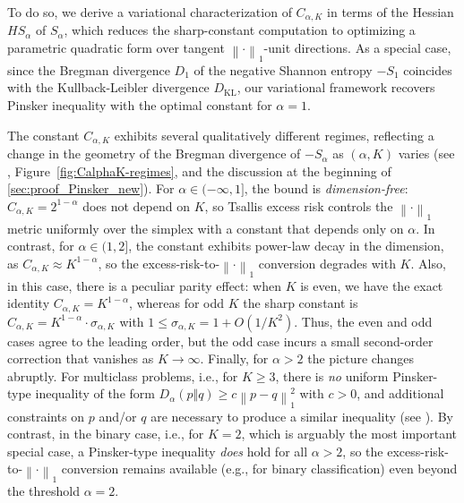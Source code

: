 \documentclass[11pt,oneside,a4paper]{article}
\newcommand{\lno}[1]{\left\lVert#1\right\rVert}
\theoremstyle{plain}
\theoremstyle{definition}
\theoremstyle{remark}
\newcommand{\KL}{D_{\mathrm{KL}}}
\begin{document}
To do so, we derive a variational characterization of $C_{\alpha,K}$ in terms of the Hessian $H S_\alpha$ of $S_\alpha$, which reduces the sharp-constant computation to optimizing a parametric quadratic form over tangent $\lno{\cdot}_1$-unit directions.
As a special case, since the Bregman divergence $D_1$ of the negative Shannon entropy $-S_1$ coincides with the Kullback-Leibler divergence $\KL$, our variational framework recovers Pinsker inequality with the optimal constant for $\alpha = 1$.

The constant $C_{\alpha,K}$ exhibits several qualitatively different regimes, reflecting a
change in the geometry of the Bregman divergence of $-S_\alpha$ as $(\alpha,K)$ varies (see , Figure~\ref{fig:CalphaK-regimes}, and the discussion at the beginning of \cref{sec:proof_Pinsker_new}).
For $\alpha \in (-\infty,1]$, the bound is \emph{dimension-free}: $C_{\alpha,K}=2^{1-\alpha}$ does not depend on $K$,
so Tsallis excess risk controls the $\lno{\cdot}_1$ metric uniformly over the simplex with a constant that depends only on $\alpha$.
In contrast, for $\alpha\in(1,2]$, the constant exhibits power-law decay in the dimension, as 
$C_{\alpha,K} \approx K^{1-\alpha}$, so the excess-risk-to-$\lno{\cdot}_1$ conversion degrades with $K$.
Also, in this case, there is a peculiar parity effect: when $K$ is even, we have the exact identity
$C_{\alpha,K}=K^{1-\alpha}$, whereas for odd $K$ the sharp constant is
$C_{\alpha,K}=K^{1-\alpha}\cdot \sigma_{\alpha, K}$ with $1 \le \sigma_{\alpha, K} = 1 + O(1/K^2)$.
Thus, the even and odd cases agree to the leading order, but the odd case incurs a small second-order correction
that vanishes as $K\to\infty$.
Finally, for $\alpha>2$ the picture changes abruptly.
For multiclass problems, i.e., for $K\ge 3$, there is \emph{no} uniform Pinsker-type inequality of the form
$D_\alpha(p\Vert q)\ge c \lno{p-q}_1^2$ with $c>0$, and additional constraints on $p$ and/or $q$ are necessary to produce a similar inequality (see ).
By contrast, in the binary case, i.e., for $K=2$, which is arguably the most important special case, a Pinsker-type inequality \emph{does} hold for all $\alpha>2$, so the excess-risk-to-$\lno{\cdot}_1$ conversion remains available (e.g., for binary classification) even beyond the threshold $\alpha=2$.
\end{document}
